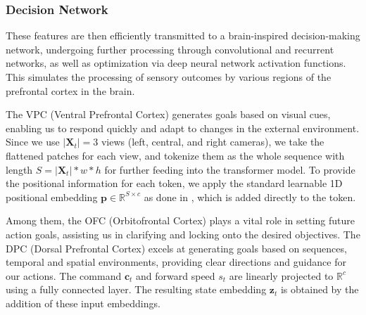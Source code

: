 

\subsubsection{Decision Network}
These features are then efficiently transmitted to a brain-inspired decision-making network, undergoing further processing through convolutional and recurrent networks, as well as optimization via deep neural network activation functions. 
This simulates the processing of sensory outcomes by various regions of the prefrontal cortex in the brain. 
%


The VPC (Ventral Prefrontal Cortex) generates goals based on visual cues, enabling us to respond quickly and adapt to changes in the external environment.  
%
Since we use $|\mathbf{X}_{t}|=3$ views (left, central, and right cameras), we take the flattened patches for each view, and tokenize them as the whole sequence with length $S=|\mathbf{X}_t|*w*h$ for further feeding into the transformer model. 
To provide the positional information for each token, we apply the standard learnable 1D positional embedding $\mathbf{p}\in \mathbb{R}^{S\times c}$ as done in \cite{Alexey:2021}, which is added directly to the token. 


Among them, the OFC (Orbitofrontal Cortex) plays a vital role in setting future action goals, assisting us in clarifying and locking onto the desired objectives. 
The DPC (Dorsal Prefrontal Cortex) excels at generating goals based on sequences, temporal and spatial environments, providing clear directions and guidance for our actions.
The command $\mathbf{c}_t$ and forward speed $s_t$ are linearly projected to $\mathbb{R}^{c}$ using a fully connected layer.
The resulting state embedding $\mathbf{z}_t$ is obtained by the addition of these input embeddings. 


